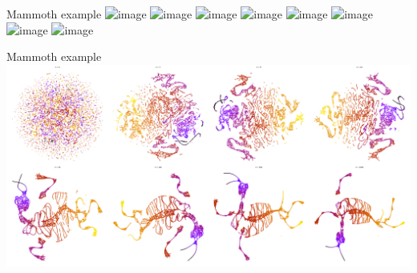 \documentclass{irdbeamer}
\begin{document}
\begin{frame}{Mammoth example}
    \centering
    \vspace{-.5cm}
    \includegraphics<1>[width=.6\textwidth]{./figs/mammoth/n5.png}%
    \includegraphics<2>[width=.6\textwidth]{./figs/mammoth/n7.png}%
    \includegraphics<3>[width=.6\textwidth]{./figs/mammoth/n9.png}%
    \includegraphics<4>[width=.6\textwidth]{./figs/mammoth/n10.png}%
    \includegraphics<5>[width=.6\textwidth]{./figs/mammoth/n50.png}%
    \includegraphics<6>[width=.6\textwidth]{./figs/mammoth/n100.png}%
    \includegraphics<7>[width=.6\textwidth]{./figs/mammoth/n500.png}%
    \includegraphics<8>[width=.6\textwidth]{./figs/mammoth/n1000.png}%
\end{frame}

\begin{frame}{Mammoth example}
    \centering
    \includegraphics[width=.8\textwidth]{./figs/mammoth/combined_scatter_plots.png}
\end{frame}
\end{document}
